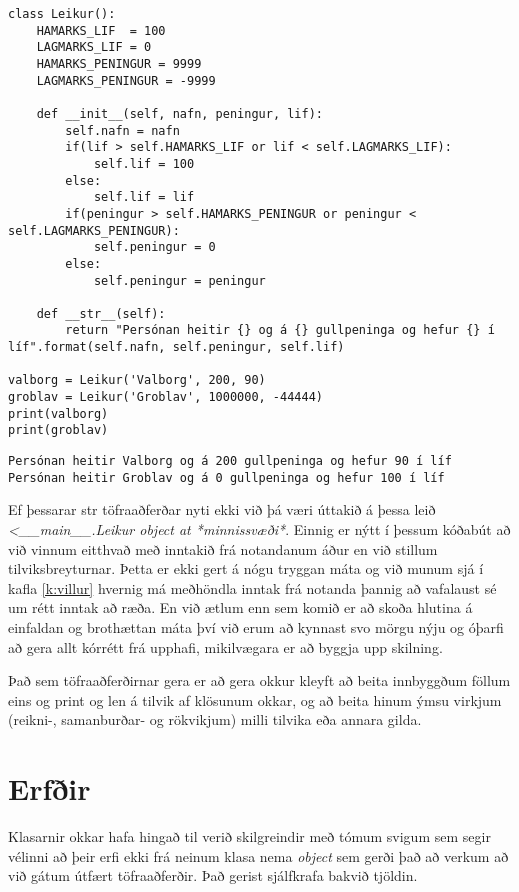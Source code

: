 \begin{lstlisting}[caption=Töfraaðferðin \_\_str\_\_, label=lst:klasar-str]
class Leikur():
	HAMARKS_LIF  = 100
	LAGMARKS_LIF = 0
	HAMARKS_PENINGUR = 9999
	LAGMARKS_PENINGUR = -9999
	
	def __init__(self, nafn, peningur, lif):
		self.nafn = nafn
		if(lif > self.HAMARKS_LIF or lif < self.LAGMARKS_LIF):
			self.lif = 100
		else:
			self.lif = lif
		if(peningur > self.HAMARKS_PENINGUR or peningur < self.LAGMARKS_PENINGUR):
			self.peningur = 0
		else:
			self.peningur = peningur
		
	def __str__(self):
		return "Persónan heitir {} og á {} gullpeninga og hefur {} í líf".format(self.nafn, self.peningur, self.lif)

valborg = Leikur('Valborg', 200, 90)
groblav = Leikur('Groblav', 1000000, -44444)
print(valborg)
print(groblav)
\end{lstlisting}
\lstset{style=uttak}
\begin{lstlisting}
Persónan heitir Valborg og á 200 gullpeninga og hefur 90 í líf
Persónan heitir Groblav og á 0 gullpeninga og hefur 100 í líf
\end{lstlisting}
\lstset{style=venjulegt}

Ef þessarar str töfraaðferðar nyti ekki við þá væri úttakið á þessa leið \textit{<\_\_main\_\_.Leikur object at *minnissvæði*}.
Einnig er nýtt í þessum kóðabút að við vinnum eitthvað með inntakið frá notandanum áður en við stillum tilviksbreyturnar.
Þetta er ekki gert á nógu tryggan máta og við munum sjá í kafla \ref{k:villur} hvernig má meðhöndla inntak frá notanda þannig að vafalaust sé um rétt inntak að ræða.
En við ætlum enn sem komið er að skoða hlutina á einfaldan og brothættan máta því við erum að kynnast svo mörgu nýju og óþarfi að gera allt kórrétt frá upphafi, mikilvægara er að byggja upp skilning.

Það sem töfraaðferðirnar gera er að gera okkur kleyft að beita innbyggðum föllum eins og print og len á tilvik af klösunum okkar, og að beita hinum ýmsu virkjum (reikni-, samanburðar- og rökvikjum) milli tilvika eða annara gilda.


\section{Erfðir}\label{uk:klasar-erfðir}
Klasarnir okkar hafa hingað til verið skilgreindir með tómum svigum sem segir vélinni að þeir erfi ekki frá neinum klasa nema \textit{object} sem gerði það að verkum að við gátum útfært töfraaðferðir.
Það gerist sjálfkrafa bakvið tjöldin.

